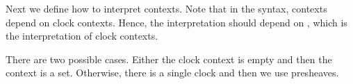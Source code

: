 
Next we define how to interpret contexts.
Note that in the syntax, contexts depend on clock contexts.
Hence, the interpretation should depend on , which is the interpretation of clock contexts.

There are two possible cases.
Either the clock context is empty and then the context is a set.
Otherwise, there is a single clock and then we use presheaves.

\begin{code}%
\>[0]\AgdaSpace{}%
\AgdaSymbol{:}\AgdaSpace{}%
\AgdaSpace{}%
\AgdaSpace{}%
\<%
\\
\>[0]\AgdaSpace{}%
\AgdaSpace{}%
\AgdaSymbol{=}\AgdaSpace{}%
\<%
\\
\>[0]\AgdaSpace{}%
\AgdaSpace{}%
\AgdaSymbol{=}\AgdaSpace{}%
\<%
\end{code}
